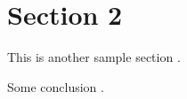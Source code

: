 \section{Section 2}
\label{sec:section2}

This is another sample section \citeauthor[Section 3]{adam}.







% 

Some conclusion \citeyear[Chapter 7, Theorem 1]{boyd2011distributed}.
